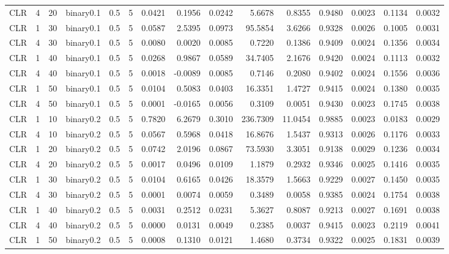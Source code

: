 \begin{longtable}{rrrrrrrrrrrrrrr}
  CLR & 4 & 20 & binary0.1 & 0.5 & 5 & 0.0421 & 0.1956 & 0.0242 & 5.6678 & 0.8355 & 0.9480 & 0.0023 & 0.1134 & 0.0032 \\ 
  CLR & 1 & 30 & binary0.1 & 0.5 & 5 & 0.0587 & 2.5395 & 0.0973 & 95.5854 & 3.6266 & 0.9328 & 0.0026 & 0.1005 & 0.0031 \\ 
  CLR & 4 & 30 & binary0.1 & 0.5 & 5 & 0.0080 & 0.0020 & 0.0085 & 0.7220 & 0.1386 & 0.9409 & 0.0024 & 0.1356 & 0.0034 \\ 
  CLR & 1 & 40 & binary0.1 & 0.5 & 5 & 0.0268 & 0.9867 & 0.0589 & 34.7405 & 2.1676 & 0.9420 & 0.0024 & 0.1113 & 0.0032 \\ 
  CLR & 4 & 40 & binary0.1 & 0.5 & 5 & 0.0018 & -0.0089 & 0.0085 & 0.7146 & 0.2080 & 0.9402 & 0.0024 & 0.1556 & 0.0036 \\ 
  CLR & 1 & 50 & binary0.1 & 0.5 & 5 & 0.0104 & 0.5083 & 0.0403 & 16.3351 & 1.4727 & 0.9415 & 0.0024 & 0.1380 & 0.0035 \\ 
  CLR & 4 & 50 & binary0.1 & 0.5 & 5 & 0.0001 & -0.0165 & 0.0056 & 0.3109 & 0.0051 & 0.9430 & 0.0023 & 0.1745 & 0.0038 \\ 
  CLR & 1 & 10 & binary0.2 & 0.5 & 5 & 0.7820 & 6.2679 & 0.3010 & 236.7309 & 11.0454 & 0.9885 & 0.0023 & 0.0183 & 0.0029 \\ 
  CLR & 4 & 10 & binary0.2 & 0.5 & 5 & 0.0567 & 0.5968 & 0.0418 & 16.8676 & 1.5437 & 0.9313 & 0.0026 & 0.1176 & 0.0033 \\ 
  CLR & 1 & 20 & binary0.2 & 0.5 & 5 & 0.0742 & 2.0196 & 0.0867 & 73.5930 & 3.3051 & 0.9138 & 0.0029 & 0.1236 & 0.0034 \\ 
  CLR & 4 & 20 & binary0.2 & 0.5 & 5 & 0.0017 & 0.0496 & 0.0109 & 1.1879 & 0.2932 & 0.9346 & 0.0025 & 0.1416 & 0.0035 \\ 
  CLR & 1 & 30 & binary0.2 & 0.5 & 5 & 0.0104 & 0.6165 & 0.0426 & 18.3579 & 1.5663 & 0.9229 & 0.0027 & 0.1450 & 0.0035 \\ 
  CLR & 4 & 30 & binary0.2 & 0.5 & 5 & 0.0001 & 0.0074 & 0.0059 & 0.3489 & 0.0058 & 0.9385 & 0.0024 & 0.1754 & 0.0038 \\ 
  CLR & 1 & 40 & binary0.2 & 0.5 & 5 & 0.0031 & 0.2512 & 0.0231 & 5.3627 & 0.8087 & 0.9213 & 0.0027 & 0.1691 & 0.0038 \\ 
  CLR & 4 & 40 & binary0.2 & 0.5 & 5 & 0.0000 & 0.0131 & 0.0049 & 0.2385 & 0.0037 & 0.9415 & 0.0023 & 0.2119 & 0.0041 \\ 
  CLR & 1 & 50 & binary0.2 & 0.5 & 5 & 0.0008 & 0.1310 & 0.0121 & 1.4680 & 0.3734 & 0.9322 & 0.0025 & 0.1831 & 0.0039 \\ 

\end{longtable}

